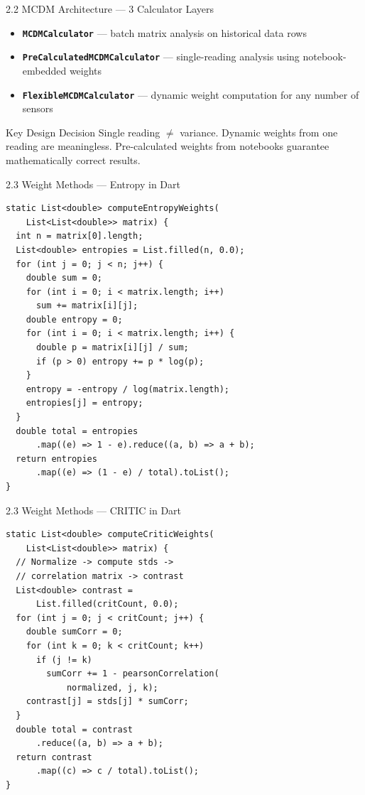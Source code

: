 \documentclass[aspectratio=169]{beamer}
\begin{document}
\begin{frame}[allowframebreaks]{2.2 MCDM Architecture --- 3 Calculator Layers}
  \begin{itemize}
    \item \texttt{\textbf{MCDMCalculator}} --- batch matrix analysis on historical data rows
    \item \texttt{\textbf{PreCalculatedMCDMCalculator}} --- single-reading analysis using notebook-embedded weights
    \item \texttt{\textbf{FlexibleMCDMCalculator}} --- dynamic weight computation for any number of sensors
  \end{itemize}

  \vspace{0.4cm}
  \begin{block}{Key Design Decision}
    \alert{Single reading $\ne$ variance.} Dynamic weights from one reading are meaningless.
    Pre-calculated weights from notebooks guarantee mathematically correct results.
  \end{block}
\end{frame}

\begin{frame}{2.3 Weight Methods --- Entropy in Dart}
  \begin{lstlisting}[style=dartstyle,basicstyle=\ttfamily\footnotesize]
static List<double> computeEntropyWeights(
    List<List<double>> matrix) {
  int n = matrix[0].length;
  List<double> entropies = List.filled(n, 0.0);
  for (int j = 0; j < n; j++) {
    double sum = 0;
    for (int i = 0; i < matrix.length; i++)
      sum += matrix[i][j];
    double entropy = 0;
    for (int i = 0; i < matrix.length; i++) {
      double p = matrix[i][j] / sum;
      if (p > 0) entropy += p * log(p);
    }
    entropy = -entropy / log(matrix.length);
    entropies[j] = entropy;
  }
  double total = entropies
      .map((e) => 1 - e).reduce((a, b) => a + b);
  return entropies
      .map((e) => (1 - e) / total).toList();
}
  \end{lstlisting}
\end{frame}

\begin{frame}{2.3 Weight Methods --- CRITIC in Dart}
  \begin{lstlisting}[style=dartstyle,basicstyle=\ttfamily\footnotesize]
static List<double> computeCriticWeights(
    List<List<double>> matrix) {
  // Normalize -> compute stds ->
  // correlation matrix -> contrast
  List<double> contrast =
      List.filled(critCount, 0.0);
  for (int j = 0; j < critCount; j++) {
    double sumCorr = 0;
    for (int k = 0; k < critCount; k++)
      if (j != k)
        sumCorr += 1 - pearsonCorrelation(
            normalized, j, k);
    contrast[j] = stds[j] * sumCorr;
  }
  double total = contrast
      .reduce((a, b) => a + b);
  return contrast
      .map((c) => c / total).toList();
}
  \end{lstlisting}
\end{frame}
\end{document}
